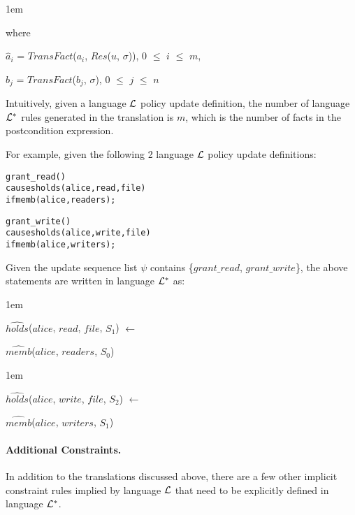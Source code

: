 \documentclass[glov2,twocolumn,final]{svjour2}
\newenvironment{vquote}
  {\begin{list}{}{\leftmargin 1em}\item[]}
  {\end{list}}
\newenvironment{vverbatim}
  {\begin{alltt}}
  {\vspace{-\baselineskip}\end{alltt}}
\begin{document}
          \begin{vquote}
            where

            $\hat{a}_{i}$ = $TransFact$($a_{i}$, $Res$($u$, $\sigma$)),
            $0$ $\leq$ $i$ $\leq$ $m$,

            $\hat{b}_{j}$ = $TransFact$($b_{j}$, $\sigma$),
            $0$ $\leq$ $j$ $\leq$ $n$
          \end{vquote}

          Intuitively, given a language ${\cal L}$ policy update definition,
          the number of language ${\cal L}^{*}$ rules generated in the
          translation is $m$, which is the number of facts in the
          postcondition expression.

          For example, given the following 2 language ${\cal L}$ policy update
          definitions:

          \begin{vverbatim}
  grant\_read()
    causes holds(alice, read, file)
    if memb(alice, readers);

  grant\_write()
    causes holds(alice, write, file)
    if memb(alice, writers);
          \end{vverbatim}

          Given the update sequence list $\psi$ contains
          \{$grant\_read$, $grant\_write$\}, the above statements are written
          in language ${\cal L}^{*}$ as:

          \begin{vquote}
            $\hat{holds}$($alice$, $read$, $file$, $S_{1}$) $\leftarrow$

            \hspace{1em}
            $\hat{memb}$($alice$, $readers$, $S_{0}$)
          \end{vquote}

          \begin{vquote}
            $\hat{holds}$($alice$, $write$, $file$, $S_{2}$) $\leftarrow$

            \hspace{1em}
            $\hat{memb}$($alice$, $writers$, $S_{1}$)
          \end{vquote}

        \paragraph{Additional Constraints.}

          In addition to the translations discussed above, there are a few
          other implicit constraint rules implied by language ${\cal L}$
          that need to be explicitly defined in language ${\cal L}^{*}$.
\end{document}
